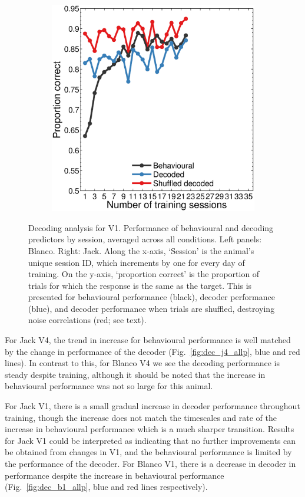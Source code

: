 \begin{figure}[htbp]
\begin{subfigure}[b]{0.5\linewidth}
	\includegraphics[width=\linewidth]{./figures/ncl_decoding/perf_v1_jack.eps}
    \end{subfigure}
    \caption{%
    Decoding analysis for V1. Performance of behavioural and decoding predictors by session, averaged across all conditions.
    Left panels: Blanco. Right: Jack.
	Along the x-axis, `Session' is the animal's unique session ID, which increments by one for every day of training.
    On the y-axis, `proportion correct' is the proportion of trials for which the response is the same as the target.
    This is presented for behavioural performance (black), decoder performance (blue), and decoder performance when trials are shuffled, destroying noise correlations (red; see text).
}
    \label{fig:dec_all_v1}
\end{figure}



For Jack V4, the trend in increase for behavioural performance is well matched by the change in performance of the decoder (Fig.~\ref{fig:dec_j4_allp}, blue and red lines). In contrast to this, for Blanco V4 we see the decoding performance is steady despite training, although it should be noted that the increase in behavioural performance was not so large for this animal.

For Jack V1, there is a small gradual increase in decoder performance throughout training, though the increase does not match the timescales and rate of the increase in behavioural performance which is a much sharper transition. Results for Jack V1 could be interpreted as indicating that no further improvements can be obtained from changes in V1, and the behavioural performance is limited by the performance of the decoder.
For Blanco V1, there is a decrease in decoder in performance despite the increase in behavioural performance (Fig.~\ref{fig:dec_b1_allp}, blue and red lines respectively). 


